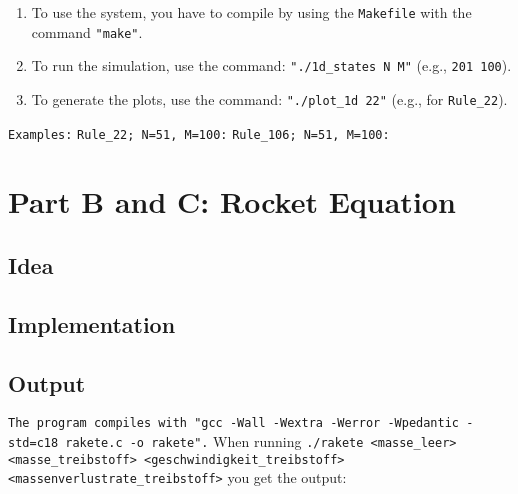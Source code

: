 \documentclass[12pt,a4paper]{article}
\begin{document}
\begin{enumerate}[label=\roman*.]
    \item 
    To use the system, you have to compile by using the \texttt{Makefile} with the command \texttt{"make"}.
    \newline
    \vspace{0.1 cm}

    \item 
    To run the simulation, use the command: \texttt{"./1d\_states N M"} (e.g., \texttt{201 100}).
    \newline
    \vspace{0.1 cm}

    \item 
    To generate the plots, use the command: \texttt{"./plot\_1d 22"} (e.g., for \texttt{Rule\_22}).
\end{enumerate} 

\vspace{0.5 cm}
\texttt{Examples:} 
\newline
\texttt{Rule\_22; N=51, M=100:} \hspace{2cm} \texttt{Rule\_106; N=51, M=100:}

\vspace{1cm}







\section{Part B and C: Rocket Equation}


\vspace{1cm}

\subsection{Idea}


\vspace{1cm}

\subsection{Implementation}


\vspace{1cm}

\subsection{Output}
\texttt{The program compiles with "gcc -Wall -Wextra -Werror -Wpedantic -std=c18 rakete.c -o rakete".}
When running \texttt{./rakete <masse\_leer> <masse\_treibstoff> <geschwindigkeit\_treibstoff> <massenverlustrate\_treibstoff>} 
you get the output:
\end{document}
